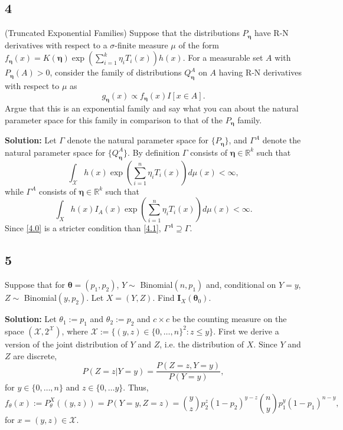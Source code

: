 \documentclass[12pt]{article}
\newcounter{ProofCounter}
\begin{document}
\subsection*{4}
\begin{tcolorbox}
(Truncated Exponential Families) Suppose that the distributions $P_{\bm{\eta}}$ have R-N derivatives with respect to a
$\sigma$-finite measure $\mu$ of the form $f_{\bm{\eta}}(x) = K(\bm{\eta}) \exp \left(  \sum_{i=1}^k \eta_i T_i(x)\right) h(x)$.
For a measurable set $A$ with $P_{\bm{\eta}}(A)>0$, consider the family of distributions $Q_{\bm{\eta}}^A$ on $A$ having R-N derivatives
with respect to $\mu$ as
\[
  g_{\bm{\eta}}(x ) \propto f_{\bm{\eta}}(x) I[x\in A].
\]
Argue that this is an exponential family and say what you can about the natural parameter space for this family in comparison to that of the $P_{\bm{\eta}}$ family.
\end{tcolorbox}

\textbf{Solution:} Let $\Gamma$ denote the natural parameter space for $\{P_{\bm{\eta}}\}$, and $\Gamma^{A}$ denote the natural parameter space for
$\{Q_{\bm{\eta}}^{A}\}$. By definition $\Gamma$ consists of $\bm{\eta} \in \mathbb{R}^{k}$ such that 
\begin{equation}
  \int_{\mathcal{X}} h(x)\exp\left( \sum_{i=1}^{n}\eta_{i}T_i(x) \right)d\mu(x) < \infty,
  \label{4.0}
\end{equation}
while $\Gamma^{A}$ consists of $\bm{\eta} \in \mathbb{R}^{k}$ such that
\begin{equation}
  \int_{X} h(x)I_A(x)\exp\left( \sum_{i=1}^{n}\eta_{i}T_i(x) \right) d\mu(x) < \infty.
  \label{4.1}
\end{equation}
Since \eqref{4.0} is a stricter condition than \eqref{4.1}, $\Gamma^{A} \supseteq \Gamma$.



\newpage

\subsection*{5}
\begin{tcolorbox}
  Suppose that for $\bm{\theta}=(p_1,p_2)$, $Y\sim$ Binomial$(n,p_1)$ and, conditional on $Y=y$, $Z\sim$ Binomial$(y,p_2)$. Let $X=(Y,Z)$.  Find $\bm{I}_{X}(\bm{\theta}_0)$.
\end{tcolorbox}

\textbf{Solution:} Let $\theta_1 := p_1$ and $\theta_2 := p_2$ and $c\times c$ be the counting measure on the space $(\mathcal{X}, 2^{\mathcal{X}})$,
where
$\mathcal{X} := \{(y,z) \in \{0,\hdots, n\}^{2} : z \leq y\}$. 
First we derive a version of the joint distribution of $Y$ and $Z$, i.e. the
distribution of $X$. Since $Y$ and $Z$ are discrete,
\[
  P(Z = z | Y = y) = \frac{P(Z = z, Y = y)}{P(Y=y)},
\]
for $y \in \{0,\hdots, n\}$ and $z \in \{0, \hdots y\}$. Thus,
\begin{equation}
  f_{\theta}(x) := P_{\theta}^{X}\left( (y,z) \right) = P(Y = y, Z = z) = \binom{y}{z}p_{2}^{z}(1 -
  p_2)^{y-z}\binom{n}{y}p_{1}^{y}(1-p_1)^{n-y},
  \label{5.1}
\end{equation}
for $x = (y,z) \in \mathcal{X}$. 
\end{document}
